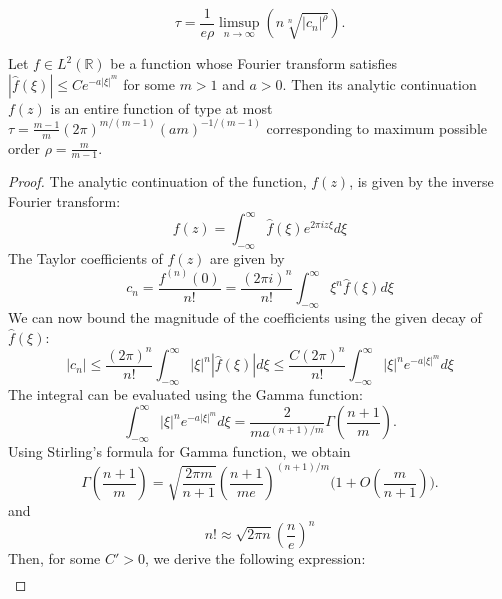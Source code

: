 \documentclass[10pt,a4paper]{amsart}
\begin{document}
    \begin{equation}\label{TypeCalculation}
        \tau = \frac{1}{e\rho} \limsup_{n \to\infty} (n \sqrt[n]{|c_n|^{\rho}}).
    \end{equation}

\begin{lemma}\label{OrderType}
Let $f \in L^2(\mathbb{R})$ be a function whose Fourier transform satisfies $|\hat{f}(\xi)| \le C e^{-a|\xi|^m}$ for some $m>1$ and $a>0$. Then its analytic continuation $f(z)$ is an entire function of type at most $\tau = \frac{m-1}{m}(2\pi)^{m/(m-1)}(am)^{-1/(m-1)}$ corresponding to maximum possible order $\rho = \frac{m}{m-1}$.
\end{lemma}

\begin{proof}
The analytic continuation of the function, $f(z)$, is given by the inverse Fourier transform:
\begin{equation*}
    f(z) = \int_{-\infty}^\infty \hat{f}(\xi) e^{2\pi i z \xi} d\xi
\end{equation*}
The Taylor coefficients of $f(z)$ are given by 
\begin{equation*}
c_n = \frac{f^{(n)}(0)}{n!} = \frac{(2\pi i)^n}{n!} \int_{-\infty}^\infty \xi^n \hat{f}(\xi) d\xi
\end{equation*}
We can now bound the magnitude of the coefficients using the given decay of $\hat{f}(\xi)$:
\begin{equation*}
|c_n| \le \frac{(2\pi)^n}{n!} \int_{-\infty}^\infty |\xi|^n |\hat{f}(\xi)| d\xi \le \frac{C(2\pi)^n}{n!} \int_{-\infty}^\infty |\xi|^n e^{-a|\xi|^m} d\xi
\end{equation*}
The integral can be evaluated using the Gamma function:
\begin{equation*}
    \int_{-\infty}^\infty |\xi|^n e^{-a|\xi|^m} d\xi = \frac{2}{m a^{(n+1)/m}} \Gamma\left(\frac{n+1}{m}\right). 
\end{equation*}
Using Stirling's formula for Gamma function, we obtain 
\begin{equation*}
 \Gamma(\frac{n+1}{m}) = \sqrt{\frac{2 \pi m}{n+1}}(\frac{n+1}{me})^{(n+1)/m}\big(1+ O(\frac{m}{n+1})\big).
\end{equation*}
and 
\begin{equation*}
    n! \approx \sqrt{2 \pi n}(\frac{n}{e})^n
\end{equation*}
Then, for some $C' >0$, we derive the following expression:
         \begin{align}\label{GeneralTaylorCoefficient}

\end{align}
\end{proof}
\end{document}
